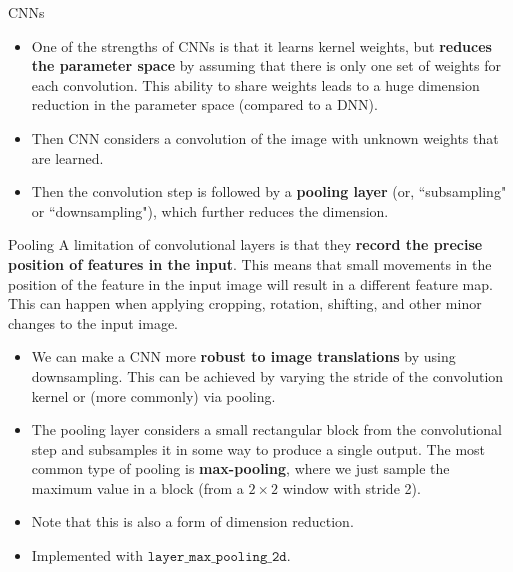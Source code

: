 \documentclass{beamer}
\begin{document}
\begin{frame}{CNNs}
\begin{itemize}
\item One of the strengths of CNNs is that it learns kernel weights, but \textbf{reduces the parameter space} by assuming that there is only one set of weights for each convolution. This ability to share weights leads to a huge dimension reduction in the parameter space (compared to a DNN).
\item Then CNN considers a convolution of the image with unknown weights that are learned.
\item Then the convolution step is followed by a \textbf{pooling layer} (or, ``subsampling" or ``downsampling"), which further reduces the dimension.
\end{itemize}
\end{frame}

\begin{frame}{Pooling}
A limitation of convolutional layers is that they \textbf{record the precise position of features in the input}. This means that small movements in the position of the feature in the input image will result in a different feature map. This can happen when applying cropping, rotation, shifting, and other minor changes to the input image.
\begin{itemize}
\item We can make a CNN more \textbf{robust to image translations} by using downsampling. This can be achieved by varying the stride of the convolution kernel or (more commonly) via pooling.
\item The pooling layer considers a small rectangular block from the convolutional step and subsamples it in some way to produce a single output. The most common type of pooling is \textbf{max-pooling}, where we just sample the maximum value in a block (from a $2\times 2$ window with stride 2).
\item Note that this is also a form of dimension reduction.
\item Implemented with $\texttt{layer\_max\_pooling\_2d}$.
\end{itemize}
\end{frame}
\end{document}
